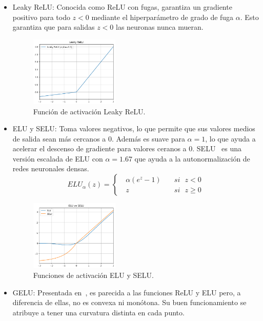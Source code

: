 \begin{itemize}
    \item Leaky ReLU: Conocida como ReLU con fugas, garantiza un gradiente positivo para todo $z<0$ mediante el hiperparámetro de grado de fuga $\alpha$.  Esto garantiza que para salidas $z<0$ las neuronas nunca mueran. 
    \begin{figure}[htbp]
        \centering
        \includegraphics[width=0.4\textwidth]{img/img24.png}
        \caption{Función de activación Leaky ReLU.}
        \label{fig:img24}
    \end{figure}
    \item ELU y SELU:  Toma valores negativos, lo que permite que sus valores medios de salida sean más cercanos a $0$. Además es suave para $\alpha = 1$, lo que ayuda a acelerar el descenso de gradiente para valores ceranos a $0$. SELU~\cite{klambauer2017self} es una versión escalada de ELU con $\alpha=1.67$ que ayuda a la autonormalización de redes neuronales densas. 
    \begin{equation}
        ELU_{\alpha}(z) = 
        \begin{cases}
             \text{ } \alpha (e^{z}-1) \quad & si \text{ } z<0 \\
             \text{ } z \quad & si  \text{ } z \geq 0
        \end{cases}
    \end{equation}
    \begin{figure}[htbp]
        \centering
        \includegraphics[width=0.4\textwidth]{img/img26.png}
        \caption{Funciones de activación ELU y SELU.}
        \label{fig:img26}
    \end{figure}
    \item GELU: Presentada en~\cite{hendrycks2016gaussian}, es parecida a las funciones ReLU y ELU pero, a diferencia de ellas, no es convexa ni monótona. Su buen funcionamiento se atribuye a tener una curvatura distinta en cada punto.

\end{itemize}
